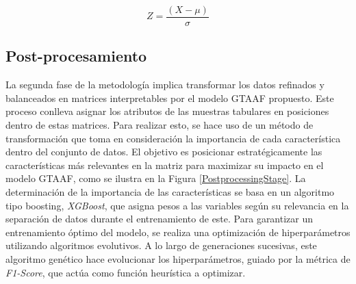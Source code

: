 \begin{equation}
	\label{Z_SCORE_EQUATION}
	Z = \frac{(X - \mu)}{\sigma}
\end{equation}




\subsection{Post-procesamiento}

La segunda fase de la metodología implica transformar los datos refinados y balanceados en matrices interpretables por el modelo GTAAF propuesto. Este proceso conlleva asignar los atributos de las muestras tabulares en posiciones dentro de estas matrices. Para realizar esto, se hace uso de un método de transformación que toma en consideración la importancia de cada característica dentro del conjunto de datos. El objetivo es posicionar estratégicamente las características más relevantes en la matriz para maximizar su impacto en el modelo GTAAF, como se ilustra en la Figura \ref{PostprocessingStage}. La determinación de la importancia de las características se basa en un algoritmo tipo boosting, \textit{XGBoost}, que asigna pesos a las variables según su relevancia en la separación de datos durante el entrenamiento de este. Para garantizar un entrenamiento óptimo del modelo, se realiza una optimización de hiperparámetros utilizando algoritmos evolutivos. A lo largo de generaciones sucesivas, este algoritmo genético hace evolucionar los hiperparámetros, guiado por la métrica de \textit{F1-Score}, que actúa como función heurística a optimizar.

